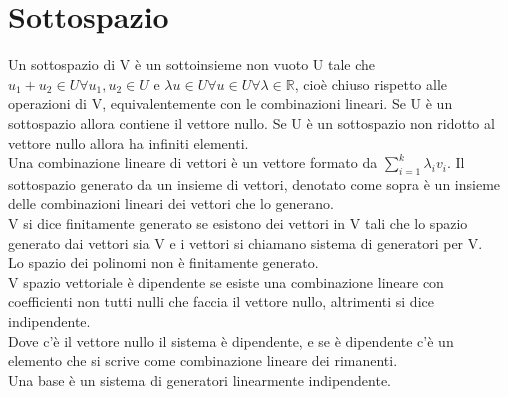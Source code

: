 \section{Sottospazio}
Un sottospazio di V \`e un sottoinsieme non vuoto U tale che $u_1+u_2\in U \forall u_1,u_2\in U$ e $\lambda u\in U\forall u\in U \forall\lambda\in\mathbb{R}$, cio\`e chiuso 
rispetto alle operazioni di V, equivalentemente con le combinazioni lineari. Se U \`e un sottospazio allora contiene il vettore nullo. Se U \`e un sottospazio non ridotto al
vettore nullo allora ha infiniti elementi.\\
Una combinazione lineare di vettori \`e un vettore formato da $\sum\limits_{i=1}^k \lambda_i v_i$. Il sottospazio generato da un insieme di vettori, denotato come sopra \`e 
un insieme delle combinazioni lineari dei vettori che lo generano.\\
V si dice finitamente generato se esistono dei vettori in V tali che lo spazio generato dai vettori sia V e i vettori si chiamano sistema di generatori per V.\\
Lo spazio dei polinomi non \`e finitamente generato.\\
V spazio vettoriale \`e dipendente se esiste una combinazione lineare con coefficienti non tutti nulli che faccia il vettore nullo, altrimenti si dice indipendente.\\
Dove c'\`e il vettore nullo il sistema \`e dipendente, e se \`e dipendente c'\`e un elemento che si scrive come combinazione lineare dei rimanenti. \\
Una base \`e un sistema di generatori linearmente indipendente.